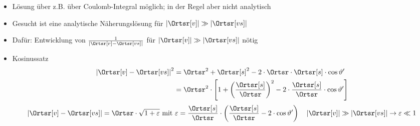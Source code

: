 \begin{frame}
\begin{itemize}[<+->]
          \item Lösung über z.B. über Coulomb-Integral möglich; in der Regel aber nicht analytisch 
          \item Gesucht ist eine analytische Näherungslösung für \(\left| \Ortsr[v] \right| \gg \left| \Ortsr[vs] \right| \)
          \item Dafür: Entwicklung von $\frac{1}{|\Ortsr[v]-\Ortsr[vs]|}$ für \(\left| \Ortsr[v] \right| \gg \left| \Ortsr[vs] \right| \) nötig
          \item Kosinussatz
            \begin{align*}
              	\left| \Ortsr[v] - \Ortsr[vs] \right|^2
		&= \Ortsr^2 + \Ortsr[s]^2 - 2 \cdot \Ortsr \cdot \Ortsr[s] \cdot \cos \vartheta' \\
		&= \Ortsr^2 \cdot \left[ 1 + \left(\dfrac{\Ortsr[s]}{\Ortsr} \right)^2 - 2 \cdot \dfrac{\Ortsr[s]}{\Ortsr} \cdot
		 \cos \vartheta' \right]
            \end{align*}
            \begin{equation*}
	\left| \Ortsr[v] - \Ortsr[vs] \right| = \Ortsr \cdot \sqrt{1 + \varepsilon} \text{ mit } \varepsilon = \dfrac{\Ortsr[s]}{\Ortsr} \cdot \left( \dfrac{\Ortsr[s]}{\Ortsr} - 2 \cdot \cos \vartheta' \right) \quad \left| \Ortsr[v] \right| \gg \left| \Ortsr[vs] \right| \to \varepsilon \ll 1
\end{equation*}

          \end{itemize}
        
        
        \end{frame}

